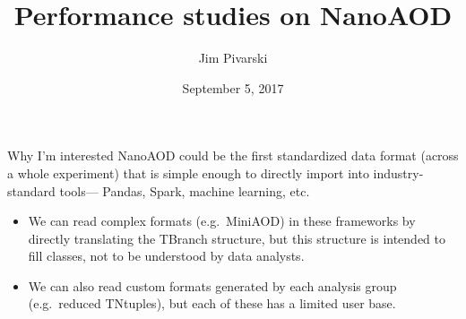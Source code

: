 \documentclass{beamer}
\title[2017-09-05-nanoaod-xpog]{Performance studies on NanoAOD}
\author{Jim Pivarski}
\institute{Princeton University -- DIANA}
\date{September 5, 2017}
\begin{document}

\begin{frame}
  \titlepage
\end{frame}




\begin{frame}{Why I'm interested}
\vspace{0.5 cm}
NanoAOD could be the first standardized data format (across a whole experiment) that is simple enough to directly import into industry-standard tools--- Pandas, Spark, machine learning, etc.

\vspace{0.3 cm}
\begin{itemize}\setlength{\itemsep}{0.5 cm}
\item<2-> We can read complex formats (e.g.\ MiniAOD) in these frameworks by directly translating the TBranch structure, but this structure is intended to fill classes, not to be understood by data analysts.

\item<3-> We can also read custom formats generated by each analysis group (e.g.\ reduced TNtuples), but each of these has a limited user base.
\end{itemize}

\vspace{0.2 cm}
\end{frame}
\end{document}

